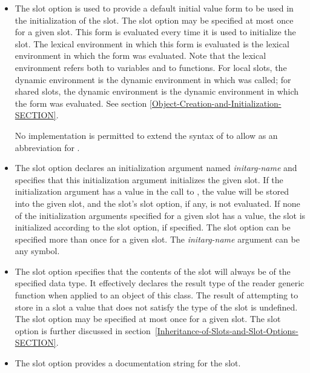 \begin{defmac}
\begin{itemize}
\item  The  slot option is used to provide a default
initial value form to be used in the initialization of the slot.  The
 slot option may be specified at most once for a given
slot.  This form is evaluated every time it is used to initialize the
slot.  The lexical
environment in which this form is evaluated is the lexical environment
in which the  form was evaluated.  Note that the lexical
environment refers both to variables and to functions.  For local
slots, the dynamic environment is the dynamic environment in which
 was called; for shared slots, the dynamic
environment is the dynamic environment in which the 
form was evaluated.  See section \ref{Object-Creation-and-Initialization-SECTION}.

No implementation is permitted to extend the syntax of 
to allow  as an abbreviation for 
.

\item 
The  slot option declares an initialization argument
named {\it initarg-name\/} and specifies that this initialization argument
initializes the given slot.  If the initialization argument has a
value in the call to , the value will be
stored into the given slot, and the slot's  slot option, if
any, is not evaluated.  If none of the initialization arguments
specified for a given slot has a value, the slot is initialized
according to the  slot option, if specified.  The 
 slot option can be specified more than once for a given
slot.  The {\it initarg-name\/} argument can be any symbol.

\item 
The  slot option specifies that the contents of the slot
will always be of the specified data type.  It effectively declares
the result type of the reader generic function when applied to an
object of this class.  The result of attempting to store in a slot a
value that does not satisfy the type of the slot is undefined.  The
 slot option may be specified at most once for a given
slot.  The  slot option is further discussed in
section~\ref{Inheritance-of-Slots-and-Slot-Options-SECTION}.

\item 
The  slot option provides a documentation string
for the slot.
\end{itemize}


\end{defmac}
